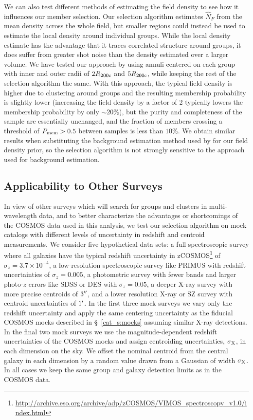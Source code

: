 We can also test different methods of estimating the field density to
see how it influences our member selection.
Our selection algorithm estimates $\hat{N}_{F}$ from the mean density
across the whole field, but smaller regions could instead be used to
estimate the local density around individual groups. While the local
density estimate has the advantage that it traces correlated structure
around groups, it does suffer from greater shot noise than the density
estimated over a larger volume. We have tested our approach
by using annuli centered on each group with inner and outer radii of
$2\mbox{$R_{200\rm{c}}$}$ and $5\mbox{$R_{200\rm{c}}$}$, while keeping the rest of the selection
algorithm the same. With this approach, the typical field density is
higher due to clustering around groups and the resulting membership probability
is slightly lower (increasing the field density by a factor of 2 typically
lowers the membership probability by only $\sim20\%$), but the purity and
completeness of the sample are essentially unchanged, and the fraction
of members crossing a threshold of $P_{\rm mem}>0.5$ between samples
is less than $10\%$. We obtain
similar results when substituting the background estimation method
used by \citet{Giodini2009} for our field density prior, so the
selection algorithm is not strongly sensitive to the approach used for
background estimation.

\subsection{Applicability to Other Surveys}
\label{cat_s:surveys}

In view of other surveys which will search for groups and clusters in
multi-wavelength data, and to better characterize the advantages or
shortcomings of the COSMOS data used in this analysis, we test our
selection algorithm on mock catalogs with different levels of
uncertainty in redshift and centroid measurements. We consider five
hypothetical data sets: a full spectroscopic survey where all galaxies
have the typical redshift uncertainty in
zCOSMOS\footnote{\url{http://archive.eso.org/archive/adp/zCOSMOS/VIMOS\_spectroscopy\_v1.0/index.html}}
of $\sigma_z=3.7\times10^{-4}$, a low-resolution spectroscopic survey
like PRIMUS \citep{Coil2010} with redshift uncertainties of
$\sigma_z=0.005$, a photometric survey with fewer bands and larger
photo-$z$ errors like SDSS \citep{Csabai2003} or DES \citep{Banerji2008}
with $\sigma_z=0.05$, a deeper X-ray survey with more precise
centroids of  $3\mbox{$^{\prime\prime}$}$, and a lower resolution X-ray or SZ survey with centroid
uncertainties of $1\mbox{$^\prime$}$. In the first three mock surveys we vary
only the redshift uncertainty and apply the same centering uncertainty
as the fiducial COSMOS mocks described in \S~\ref{cat_s:mocks} assuming
similar X-ray detections. In the
final two mock surveys we use the magnitude-dependent redshift
uncertainties of the COSMOS mocks and assign centroiding
uncertainties, $\sigma_{\rm X}$, in each dimension on the sky. We
offset the nominal centroid from the central galaxy in each dimension
by a random value drawn from a Gaussian of width $\sigma_{\rm X}$. In all
cases we keep the same group and galaxy detection limits as in the
COSMOS data.

